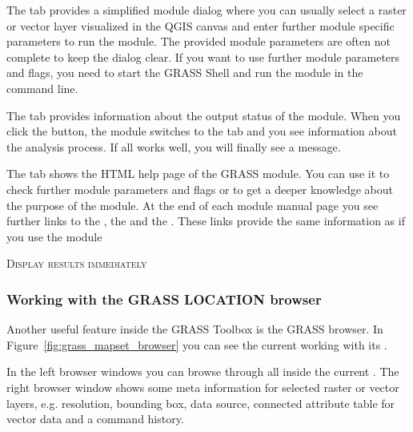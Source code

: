 
The  tab provides a simplified module dialog where you can 
usually select a raster or vector layer visualized in the QGIS canvas and 
enter further module specific parameters to run the module. The provided 
module parameters are often not complete to keep the dialog clear. If you want 
to use further module parameters and flags, you need to start the GRASS Shell 
and run the module in the command line.


The  tab provides information about the output status of the 
module. When you click the  button, the module switches to the 
 tab and you see information about the analysis process. If all 
works well, you will finally see a  message.


The  tab shows the HTML help page of the GRASS module. You can 
use it to check further module parameters and flags or to get a deeper 
knowledge about the purpose of the module. At the end of each module 
manual page you see further links to the , the 
 and the . These links provide 
the same information as if you use the module  

\begin{Tip}\caption{\textsc{Display results immediately}}
\end{Tip} 

\subsubsection{Working with the GRASS LOCATION browser} 

Another useful feature inside the GRASS Toolbox is the GRASS 
 browser. In Figure~\ref{fig:grass_mapset_browser} you 
can see the current working  with its .

In the left browser windows you can browse through all  
inside the current . The right browser window shows some 
meta information for selected raster or vector layers, e.g. resolution, 
bounding box, data source, connected attribute table for vector data and a 
command history.

